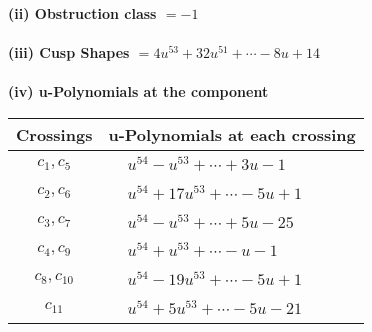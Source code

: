 \documentclass[1p]{elsarticle_modified}
\theoremstyle{definition}
\begin{document}
\flushleft \textbf{(ii) Obstruction class $= -1$}\\~\\
\flushleft \textbf{(iii) Cusp Shapes $= 4 u^{53}+32 u^{51}+\cdots-8 u+14$}\\~\\
\newpage\renewcommand{\arraystretch}{1}
\flushleft \textbf{(iv) u-Polynomials at the component}\newline \\
\begin{tabular}{m{50pt}|m{274pt}}
Crossings & \hspace{64pt}u-Polynomials at each crossing \\
\hline $$\begin{aligned}c_{1},c_{5}\end{aligned}$$&$\begin{aligned}
&u^{54}- u^{53}+\cdots+3 u-1
\end{aligned}$\\
\hline $$\begin{aligned}c_{2},c_{6}\end{aligned}$$&$\begin{aligned}
&u^{54}+17 u^{53}+\cdots-5 u+1
\end{aligned}$\\
\hline $$\begin{aligned}c_{3},c_{7}\end{aligned}$$&$\begin{aligned}
&u^{54}- u^{53}+\cdots+5 u-25
\end{aligned}$\\
\hline $$\begin{aligned}c_{4},c_{9}\end{aligned}$$&$\begin{aligned}
&u^{54}+u^{53}+\cdots- u-1
\end{aligned}$\\
\hline $$\begin{aligned}c_{8},c_{10}\end{aligned}$$&$\begin{aligned}
&u^{54}-19 u^{53}+\cdots-5 u+1
\end{aligned}$\\
\hline $$\begin{aligned}c_{11}\end{aligned}$$&$\begin{aligned}
&u^{54}+5 u^{53}+\cdots-5 u-21
\end{aligned}$\\
\hline
\end{tabular}\\~\\
\end{document}
